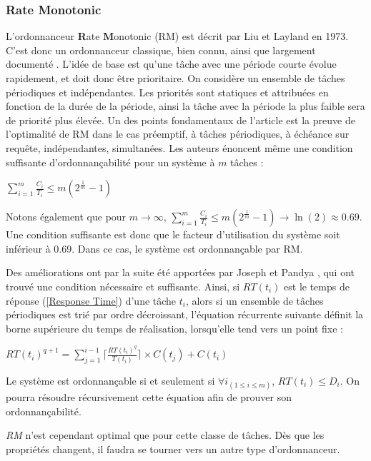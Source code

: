 \documentclass[11pt,a4paper,oneside]{report}
\newcommand{\customhighlight}[1]{{\textbf{#1}}}
\begin{document}
	\subsubsection{Rate Monotonic}
	L'ordonnanceur \customhighlight{R}ate \customhighlight{M}onotonic (RM) est décrit par Liu et Layland \cite{liu_scheduling_1973} en 1973. C'est 
	donc un ordonnanceur classique, bien connu, ainsi que largement documenté \cite{kermia_ordonnancement_2009}. 
	L'idée de base est qu'une tâche avec une période courte évolue rapidement, et 
	doit donc être prioritaire.\medskip
	On considère un ensemble de tâches périodiques et indépendantes.
	Les priorités sont statiques et attribuées en fonction de la durée de la période, ainsi 
	la tâche avec la période la plus faible sera de priorité plus élevée. 
	Un des points fondamentaux de l'article est la preuve de l'optimalité de RM dans le cas 
	préemptif, à tâches périodiques, à échéance sur requête, indépendantes, simultanées.
	Les auteurs énoncent même une condition suffisante d'ordonnançabilité pour un système à $m$ tâches : \medskip
	\begin{center}
		$\sum_{i=1}^{m}\frac{C_i}{T_i} \leq m(2^{\frac{1}{m}}-1)$
	\end{center}
	Notons également que pour $m \rightarrow \infty$, $\sum_{i=1}^{m}\frac{C_i}{T_i} \leq m(2^{\frac{1}{m}}-1) \rightarrow \ln(2) \approx 0.69$.
	Une condition suffisante est donc que le facteur d'utilisation du système soit inférieur à 0.69. 
	Dans ce cas, le système est ordonnançable par RM.\medskip
	
	Des améliorations ont par la suite été apportées par Joseph et Pandya \cite{joseph_finding_1986},
	qui ont trouvé une condition nécessaire et suffisante. 
	Ainsi, si $RT(t_i)$ est le temps de réponse (\ref{Response Time}) d'une tâche $t_i$, 
	alors si un ensemble de tâches périodiques est trié par ordre décroissant, l'équation 
	récurrente suivante 
	définit la borne supérieure du temps de réalisation, lorsqu'elle tend vers un point fixe :
	\begin{center}
		$RT(t_i)^{q+1} = \sum_{j=1}^{i-1} \lceil \frac{RT(t_i)^q}{T(t_i)} \rceil \times C(t_j) + C(t_i)$
	\end{center}
	Le système est ordonnançable si et seulement si $\forall i_{(1 \leq i \leq m)}$, $RT(t_i) \leq D_i$.
	On pourra résoudre récursivement cette équation afin de prouver son ordonnançabilité.\medskip
	
	\textit{RM} n'est cependant optimal que pour cette classe de tâches. Dès que les propriétés changent, 
	il faudra se tourner vers un autre type d'ordonnanceur.
	
\end{document}
